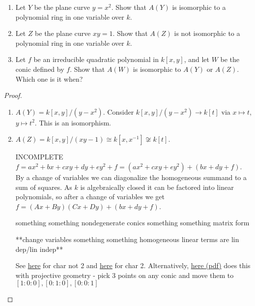 \label{1.1.1}

\begin{enumerate}[label = (\alph*)]
    \item Let $Y$ be the plane curve $y = x^2$. Show that $A(Y)$ is isomorphic to a polynomial ring in one variable over $k$.
    
    \item Let $Z$ be the plane curve $xy = 1$. Show that $A(Z)$ is not isomorphic to a polynomial ring in one variable over $k$.
    
    \item Let $f$ be an irreducible quadratic polynomial in $k[x, y]$, and let $W$ be the conic defined by $f$. Show that $A(W)$ is isomorphic to $A(Y)$ or $A(Z)$. Which one is it when?
\end{enumerate}

\begin{proof}
    \begin{enumerate}[label = (\alph*)]
        \item $A(Y) = k[x, y]/(y - x^2)$. Consider $k[x, y]/(y - x^2) \longrightarrow k[t]$ via $x \mapsto t$, $y \mapsto t^2$. This is an isomorphism.
        
        \item $A(Z) = k[x, y]/(xy - 1) \cong k[x, x^{-1}] \not\cong k[t]$.
        
        \item[INCOMPLETE] $f = ax^2 + bx + cxy + dy + ey^2 + f = (ax^2 + cxy + ey^2) + (bx + dy + f)$. By a change of variables we can diagonalize the homogeneous summand to a sum of squares. As $k$ is algebraically closed it can be factored into linear polynomials, so after a change of variables we get $f = (Ax + By)(Cx + Dy) + (bx + dy + f)$.
        
        something something nondegenerate conics something something matrix form
        
        **change variables something something homogeneous linear terms are lin dep/lin indep**

        See \href{https://math.stackexchange.com/questions/1200983/irreducible-conics/1201595}{here} for char not 2 and \href{https://math.stackexchange.com/questions/532289/conics-over-fields-of-characteristic-two}{here} for char 2. Alternatively, \href{https://math.berkeley.edu/~reb/courses/256A/1.1.pdf}{here (pdf)} does this with projective geometry - pick 3 points on any conic and move them to $[1 : 0 : 0], [0 : 1 : 0], [0 : 0 : 1]$
    \end{enumerate}
\end{proof}
